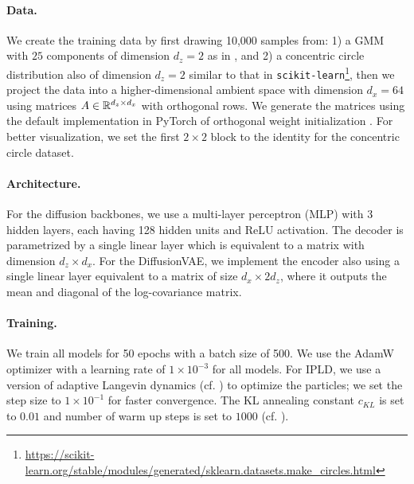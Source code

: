 \paragraph{Data.} We create the training data by first drawing 10,000 samples from: 1)  a \gls*{GMM} with $25$ components of dimension $d_z=2$ as in \citet{boys2024tweedie,cardoso2024monte}, and 2) a concentric circle distribution also of dimension $d_z=2$ similar to that in \texttt{scikit-learn}\footnote{{\scriptsize\url{https://scikit-learn.org/stable/modules/generated/sklearn.datasets.make_circles.html}}}\citep{sklearn_api}, then we project the data into a higher-dimensional ambient space with dimension $d_x=64$ using matrices $A \in \mathbb{R}^{d_z \times d_x}$ with orthogonal rows. We generate the matrices using the default implementation in PyTorch of orthogonal weight initialization \citep{saxe2014exactsolutionsnonlineardynamics}. For better visualization, we set the first $2\times 2$ block to the identity for the concentric circle dataset.

\paragraph{Architecture.} For the diffusion backbones, we use a multi-layer perceptron (MLP) with 3 hidden layers, each having 128 hidden units and ReLU activation. The decoder is parametrized by a single linear layer which is equivalent to a matrix with dimension $d_z \times d_x$. For the \gls*{DiffusionVAE}, we implement the encoder also using a single linear layer equivalent to a matrix of size $d_x \times 2d_z$, where it outputs the mean and diagonal of the log-covariance matrix.

\paragraph{Training.} We train all models for 50 epochs with a batch size of 500. We use the AdamW optimizer \citep{loshchilov2019decoupledweightdecayregularization} with a learning rate of $1\times10^{-3}$ for all models. For \gls*{IPLD}, we use a version of adaptive Langevin dynamics \citep{kim2020stochasticgradientlangevindynamics} (cf. ) to optimize the particles; we set the step size to $1\times 10^{-1}$ for faster convergence. The KL annealing constant $c_{KL}$ is set to $0.01$ and number of warm up steps is set to $1000$ (cf. ).



